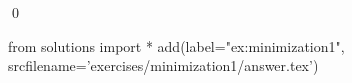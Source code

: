 
\begin{ex} 
  \label{ex:minimization1}
  
  \qed
\end{ex} 
\begin{python0}
from solutions import *
add(label="ex:minimization1",
    srcfilename='exercises/minimization1/answer.tex') 
\end{python0}
